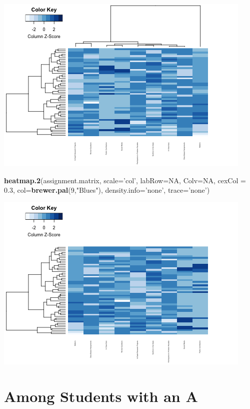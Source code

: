 \documentclass[]{article}
\newenvironment{Shaded}{\begin{snugshade}}{\end{snugshade}}
\newcommand{\KeywordTok}[1]{\textcolor[rgb]{0.13,0.29,0.53}{\textbf{#1}}}
\newcommand{\DataTypeTok}[1]{\textcolor[rgb]{0.13,0.29,0.53}{#1}}
\newcommand{\DecValTok}[1]{\textcolor[rgb]{0.00,0.00,0.81}{#1}}
\newcommand{\FloatTok}[1]{\textcolor[rgb]{0.00,0.00,0.81}{#1}}
\newcommand{\StringTok}[1]{\textcolor[rgb]{0.31,0.60,0.02}{#1}}
\newcommand{\OtherTok}[1]{\textcolor[rgb]{0.56,0.35,0.01}{#1}}
\newcommand{\NormalTok}[1]{#1}
\begin{document}
\includegraphics{figures/correlations-all-1.png}

\begin{Shaded}
\begin{Highlighting}[]
\KeywordTok{heatmap.2}\NormalTok{(assignment.matrix, }
        \DataTypeTok{scale=}\StringTok{'col'}\NormalTok{,}
        \DataTypeTok{labRow=}\OtherTok{NA}\NormalTok{,}
        \DataTypeTok{Colv=}\OtherTok{NA}\NormalTok{,}
        \DataTypeTok{cexCol =} \FloatTok{0.3}\NormalTok{,}
        \DataTypeTok{col=}\KeywordTok{brewer.pal}\NormalTok{(}\DecValTok{9}\NormalTok{,}\StringTok{"Blues"}\NormalTok{),}
        \DataTypeTok{density.info=}\StringTok{'none'}\NormalTok{, }\DataTypeTok{trace=}\StringTok{'none'}\NormalTok{)}
\end{Highlighting}
\end{Shaded}

\includegraphics{figures/correlations-all-2.png}

\section{Among Students with an A}\label{among-students-with-an-a}
\end{document}

